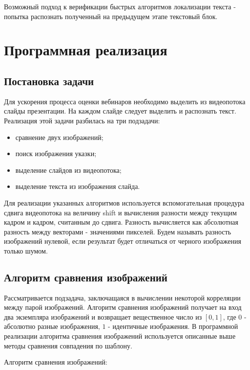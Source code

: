 \documentclass[oneside,final,14pt]{extreport}
\begin{document}
Возможный подход к верификации быстрых алгоритмов локализации текста - попытка распознать полученный на предыдущем этапе текстовый блок.

\chapter{Программная реализация}
\section{Постановка задачи}

Для ускорения процесса оценки вебинаров необходимо выделить из видеопотока слайды презентации. На каждом слайде следует выделить и распознать текст. Реализация этой задачи разбилась на три подзадачи:
\begin{itemize}
\item сравнение двух изображений;
\item поиск изображения указки;
\item выделение слайдов из видеопотока;
\item выделение текста из изображения слайда.
\end{itemize}

Для реализации указанных алгоритмов используется вспомогательная процедура сдвига  видеопотока на величину shift и вычисления разности между текущим кадром и кадром, считанным до сдвига. Разность вычисляется как абсолютная разность между векторами - значениями пикселей. Будем называть разность изображений нулевой, если результат будет отличаться от черного изображения только шумом.

\section{Алгоритм сравнения изображений}
\label{Alg:picCMP}
Рассматривается подзадача, заключащаяся в вычислении некоторой корреляции между парой изображений.  Алгоритм сравнения изображений получает на вход два экземпляра изображений и возвращает вещественное число из $[0,1]$, где $0$ - абсолютно разные изображения, $1$ - идентичные изображения.  В программной реализации алгоритма сравнения изображений используется описанные выше методы сравнения совпадения по шаблону.

Алгоритм сравнения изображений:
\end{document}
